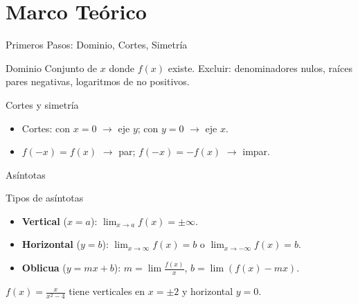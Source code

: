 \documentclass[aspectratio=169]{beamer}
\begin{document}
\begin{frame}[plain]
  \titlepage
\end{frame}

\section{Marco Teórico}

\begin{frame}{Primeros Pasos: Dominio, Cortes, Simetría}
  \begin{block}{Dominio}
    Conjunto de $x$ donde $f(x)$ existe. Excluir: denominadores nulos, raíces pares negativas, logaritmos de no positivos.
  \end{block}
  \vspace{6pt}
  \begin{block}{Cortes y simetría}
    \begin{itemize}
      \item Cortes: con $x=0$ $\to$ eje $y$; con $y=0$ $\to$ eje $x$.
      \item $f(-x)=f(x)$ $\to$ par; $f(-x)=-f(x)$ $\to$ impar.
    \end{itemize}
  \end{block}
\end{frame}

\begin{frame}{Asíntotas}
  \begin{block}{Tipos de asíntotas}
    \begin{itemize}
      \item \textbf{Vertical} ($x=a$): $\lim_{x\to a}f(x) = \pm\infty$.
      \item \textbf{Horizontal} ($y=b$): $\lim_{x\to\infty}f(x)=b$ o $\lim_{x\to-\infty}f(x)=b$.
      \item \textbf{Oblicua} ($y=mx+b$): $m=\lim\frac{f(x)}{x}$, $b=\lim(f(x)-mx)$.
    \end{itemize}
  \end{block}
  \vspace{6pt}
  \begin{mwextra}[Ejemplo]
    $f(x)=\frac{x}{x^2-4}$ tiene verticales en $x=\pm2$ y horizontal $y=0$.
  \end{mwextra}
\end{frame}
\end{document}
